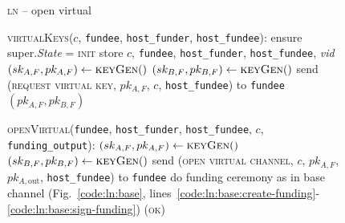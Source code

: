 \begin{figure}[H]
  \begin{processbox}{\textsc{ln} -- open virtual}
    \begin{algorithmic}[1]
      \State \textsc{virtualKeys}($c$, \texttt{fundee}, \texttt{host\_funder},
      \texttt{host\_fundee}):
      \Indent
        \State ensure super.\textit{State} = \textsc{init} 
        \State store $c$, \texttt{fundee}, \texttt{host\_funder},
        \texttt{host\_fundee}, \textit{vid}
        \State $(sk_{A, F}, pk_{A, F}) \gets \textsc{keyGen}()$
          \State $(sk_{B, F}, pk_{B, F}) \gets \textsc{keyGen}()$
        \Else \: 
          \State send (\textsc{request virtual key}, $pk_{A, F}$, $c$,
          \texttt{host\_fundee}) to \texttt{fundee}
          \State {}
          \State {}
          \State {}
          \State {}
          \State {}
        \EndIf
        \State \Return $(pk_{A, F}, pk_{B, F})$
      \EndIndent
      \Statex

      \State \textsc{openVirtual}(\texttt{fundee}, \texttt{host\_funder},
      \texttt{host\_fundee}, $c$, \texttt{funding\_output}): 
      \Indent
        \State $(sk_{A, F}, pk_{A, F}) \gets \textsc{keyGen}()$
          \State $(sk_{B, F}, pk_{B, F}) \gets \textsc{keyGen}()$
        \Else \: 
          \State send (\textsc{open virtual channel}, $c$, $pk_{A, F}$, $pk_{A,
          \mathrm{out}}$, \texttt{host\_fundee}) to \texttt{fundee}
          \State {}
          \State {}
          \State {}
          \State {}
          \State {}
        \EndIf
          \State do funding ceremony as in base channel
          (Fig.~\ref{code:ln:base},
          lines~\ref{code:ln:base:create-funding}-\ref{code:ln:base:sign-funding})
        \EndIf
        \State \Return (\textsc{ok})
      \EndIndent
    \end{algorithmic}
  \end{processbox}
  \caption{}
  \label{code:ln:open-virtual}
\end{figure}

